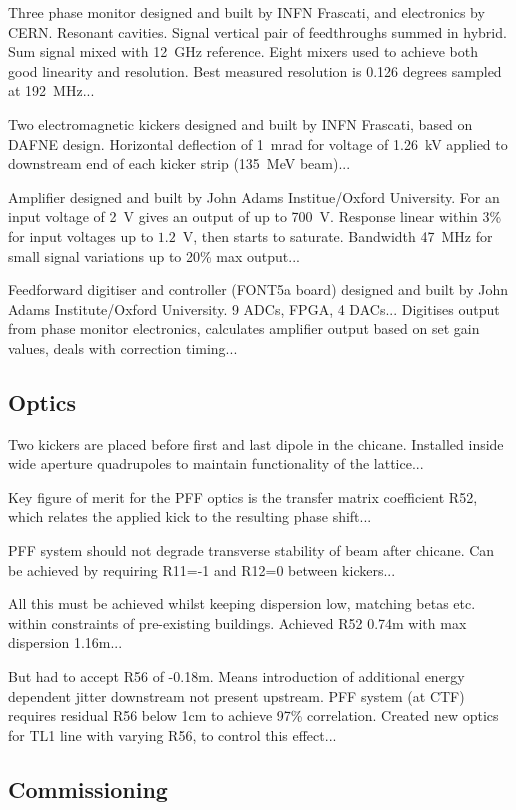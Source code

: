 \documentclass[%
 reprint,
 amsmath,amssymb,
 aps,
]{revtex4-1}
\begin{document}
Three phase monitor designed and built by INFN Frascati, and electronics by CERN. Resonant cavities. Signal vertical pair of feedthroughs summed in hybrid. Sum signal mixed with 12~GHz reference. Eight mixers used to achieve both good linearity and resolution. Best measured resolution is 0.126 degrees sampled at 192~MHz...

Two electromagnetic kickers designed and built by INFN Frascati, based on DAFNE design. Horizontal deflection of 1~mrad for voltage of 1.26~kV applied to downstream end of each kicker strip (135~MeV beam)... 

Amplifier designed and built by John Adams Institue/Oxford University. For an input voltage of 2~V gives an output of up to 700~V. Response linear within 3\% for input voltages up to \(1.2\)~V, then starts to saturate. Bandwidth 47~MHz for small signal variations up to 20\% max output...

Feedforward digitiser and controller (FONT5a board) designed and built by John Adams Institute/Oxford University. 9 ADCs, FPGA, 4 DACs... Digitises output from phase monitor electronics, calculates amplifier output based on set gain values, deals with correction timing...

\subsection{\label{ss:hardware}Optics}

Two kickers are placed before first and last dipole in the chicane. Installed inside wide aperture quadrupoles to maintain functionality of the lattice...

Key figure of merit for the PFF optics is the transfer matrix coefficient R52, which relates the applied kick to the resulting phase shift...

PFF system should not degrade transverse stability of beam after chicane. Can be achieved by requiring R11=-1 and R12=0 between kickers...

All this must be achieved whilst keeping dispersion low, matching betas etc. within constraints of pre-existing buildings. Achieved R52 0.74m with max dispersion 1.16m...

But had to accept R56 of -0.18m. Means introduction of additional energy dependent jitter downstream not present upstream. PFF system (at CTF) requires residual R56 below 1cm to achieve 97\% correlation. Created new optics for TL1 line with varying R56, to control this effect...

\subsection{\label{ss:commiss}Commissioning}
\end{document}
